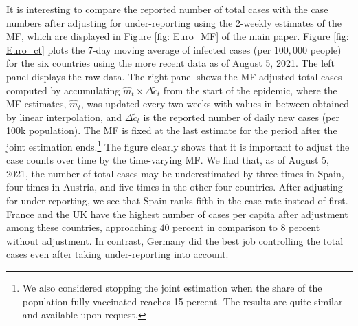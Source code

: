 \documentclass[12pt]{article}
\begin{document}
It is interesting to compare the reported number of total cases with the case
numbers after adjusting for under-reporting using the 2-weekly estimates of
the MF, which are displayed in Figure \ref{fig: Euro_MF} of the main paper.
Figure \ref{fig: Euro_ct} plots the 7-day moving average of infected cases
(per $100,000$ people) for the six countries using the more recent data as of
August 5, 2021. The left panel displays the raw data. The right panel shows
the MF-adjusted total cases computed by accumulating $\hat{m}_{t}\times
\Delta\tilde{c}_{t}$ from the start of the epidemic, where the MF estimates,
$\hat{m}_{t}$, was updated every two weeks with values in between obtained by
linear interpolation, and $\Delta\tilde{c}_{t}$ is the reported number of
daily new cases (per 100k population). The MF is fixed at the last estimate
for the period after the joint estimation ends.\footnote{We also considered
stopping the joint estimation when the share of the population fully
vaccinated reaches 15 percent. The results are quite similar and available
upon request.} The figure clearly shows that it is important to adjust the
case counts over time by the time-varying MF. We find that, as of August 5,
2021, the number of total cases may be underestimated by three times in Spain,
four times in Austria, and five times in the other four countries. After
adjusting for under-reporting, we see that Spain ranks fifth in the case rate
instead of first. France and the UK have the highest number of cases per
capita after adjustment among these countries, approaching $40$ percent in
comparison to $8$ percent without adjustment. In contrast, Germany did the
best job controlling the total cases even after taking under-reporting into account.%
\end{document}
